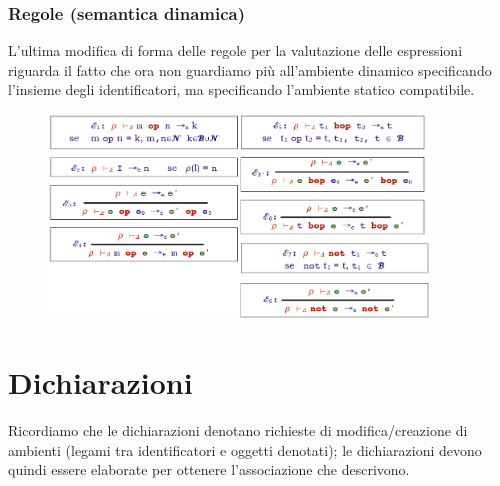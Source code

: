 \documentclass[a4paper,oneside,titlepage]{book}
\begin{document}
\subsection{Regole (semantica dinamica)}
L'ultima modifica di forma delle regole per la valutazione delle espressioni riguarda il fatto che ora non guardiamo più all'ambiente dinamico specificando l'insieme degli identificatori, ma specificando l'ambiente statico compatibile.
\begin{figure}[htp]
	\centering
	\includegraphics[width=0.9\textwidth]{expRegole4.png}
\end{figure}


\chapter{Dichiarazioni}
Ricordiamo che le dichiarazioni denotano richieste di modifica/creazione di ambienti (legami tra identificatori e oggetti denotati); le dichiarazioni devono quindi essere elaborate per ottenere l'associazione che descrivono.
\end{document}
